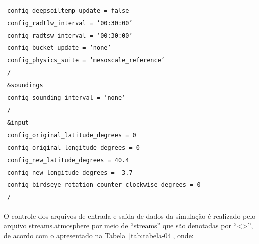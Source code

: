 \documentclass[12pt,a4paper,oneside]{book}
\providecommand{\arraybackslash}{\tabularnewline}
\begin{document}
\begin{longtable}[]{@{}
  >{\raggedright\arraybackslash}p{}@{}}
\texttt{\hspace*{1em}config\_deepsoiltemp\_update = false} \\
\texttt{\hspace*{1em}config\_radtlw\_interval = '00:30:00'} \\
\texttt{\hspace*{1em}config\_radtsw\_interval = '00:30:00'} \\
\texttt{\hspace*{1em}config\_bucket\_update = 'none'} \\
\texttt{\hspace*{1em}config\_physics\_suite = 'mesoscale\_reference'} \\
\texttt{/} \\
\texttt{\&soundings} \\
\texttt{\hspace*{1em}config\_sounding\_interval = 'none'} \\
\texttt{/} \\
\texttt{\&input} \\
\texttt{\hspace*{1em}config\_original\_latitude\_degrees = 0} \\
\texttt{\hspace*{1em}config\_original\_longitude\_degrees = 0} \\
\texttt{\hspace*{1em}config\_new\_latitude\_degrees = 40.4} \\
\texttt{\hspace*{1em}config\_new\_longitude\_degrees = -3.7} \\
\texttt{\hspace*{1em}config\_birdseye\_rotation\_counter\_clockwise\_degrees = 0} \\
\texttt{/} \\
\end{longtable}

O controle dos arquivos de entrada e saída de dados da simulação é realizado pelo arquivo streams.atmosphere por meio de ``streams'' que são denotadas por ``\textless\textgreater'', de acordo com o apresentado na Tabela~\ref*{tab:tabela-04}, onde:
\end{document}
